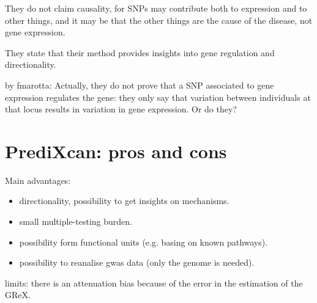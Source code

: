 \documentclass[../main.tex]{subfiles}
\begin{document}
They do not claim causality, for SNPs may contribute both to expression 
and to other things, and it may be that the other things are the cause 
of the disease, not gene expression.

They state that their method provides insights into gene regulation and 
directionality.

by fmarotta: Actually, they do not prove that a SNP associated to gene 
expression regulates the gene: they  only say that variation between 
individuals at that locus results in variation in gene expression. Or do 
they?

\section{PrediXcan: pros and cons}

Main advantages:

\begin{itemize}
\item directionality, possibility to get insights on mechanisms.
\item small multiple-testing burden.
\item possibility form functional units (e.g. basing on known pathways).
\item possibility to reanalise gwas data (only the genome is needed).
\end{itemize}



limits: there is an attenuation bias because of the error in the 
estimation of the GReX.
\end{document}
